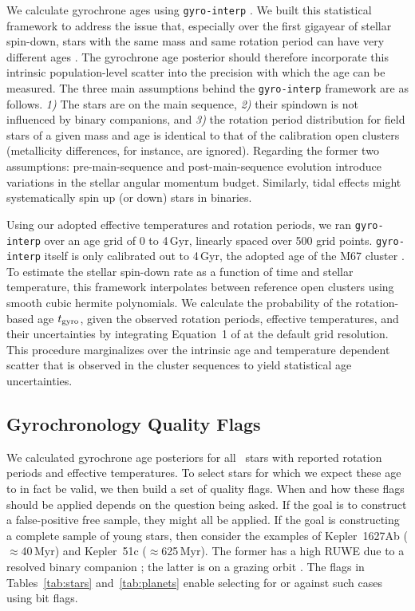 \documentclass[11pt,twocolumn,tighten]{aastex63}
\begin{document}
We calculate gyrochrone ages using \texttt{gyro-interp}
\citep{Bouma_2023}.  We built this statistical framework to address
the issue that, especially over the first gigayear of stellar
spin-down, stars with the same mass and same rotation period can have
very different ages \citep[e.g.][]{Curtis_2019_ngc6811}.  The
gyrochrone age posterior should therefore incorporate this intrinsic
population-level scatter into the precision with which the age can be
measured.  The three main assumptions behind the \texttt{gyro-interp}
framework are as follows.  {\it 1)} The stars are on the main
sequence, {\it 2)} their spindown is not influenced by binary
companions, and {\it 3)} the rotation period distribution for field
stars of a given mass and age is identical to that of the calibration
open clusters (metallicity differences, for instance, are ignored).  
Regarding the former two assumptions: pre-main-sequence and
post-main-sequence evolution introduce variations in the stellar
angular momentum budget.  Similarly, tidal effects might
systematically spin up (or down) stars in binaries.

Using our adopted effective temperatures and rotation periods, we ran
\texttt{gyro-interp} over an age grid of 0 to 4\,Gyr, linearly spaced
over 500 grid points.  \texttt{gyro-interp} itself is only calibrated
out to 4\,Gyr, the adopted age of the M67 cluster
\citep[see][]{Dungee_2022,Gruner_2023}.  To estimate the stellar
spin-down rate as a function of time and stellar temperature, this
framework interpolates between reference open clusters using smooth
cubic hermite polynomials.  We calculate the probability of the
rotation-based age $t_{\rm gyro}$, given the observed rotation
periods, effective temperatures, and their uncertainties by
integrating Equation~1 of \citep{Bouma_2023} at the default grid
resolution.  This procedure marginalizes over the intrinsic age and
temperature dependent scatter that is observed in the cluster
sequences to yield statistical age uncertainties.


\subsection{Gyrochronology Quality Flags}
\label{subsec:flags}
We calculated gyrochrone age posteriors for all \nuniqstarsantosrot\
stars with reported rotation periods and effective temperatures.  To
select stars for which we expect these age to in fact be valid, we
then build a set of quality flags.  When and how these flags should be
applied depends on the question being asked.  If the goal is to
construct a false-positive free sample, they might all be applied.  If
the goal is constructing a complete sample of young stars, then
consider the examples of Kepler~1627Ab ($\approx$40\,Myr) and
Kepler~51c ($\approx$625\,Myr).  The former has a high RUWE due to a
resolved binary companion \citep{Bouma_2022a}; the latter is on a
grazing orbit \citep{2014ApJ...783...53M}.  The flags in
Tables~\ref{tab:stars} and~\ref{tab:planets} enable selecting for or
against such cases using bit flags.
\end{document}
